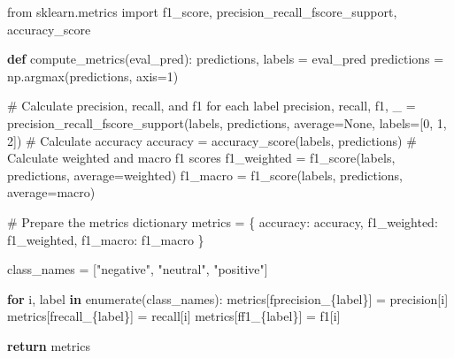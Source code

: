 \documentclass[
  letterpaper,
  DIV=11,
  numbers=noendperiod]{scrreprt}
\newenvironment{Shaded}{\begin{snugshade}}{\end{snugshade}}
\newcommand{\BuiltInTok}[1]{\textcolor[rgb]{0.00,0.23,0.31}{#1}}
\newcommand{\CommentTok}[1]{\textcolor[rgb]{0.37,0.37,0.37}{#1}}
\newcommand{\ControlFlowTok}[1]{\textcolor[rgb]{0.00,0.23,0.31}{\textbf{#1}}}
\newcommand{\DecValTok}[1]{\textcolor[rgb]{0.68,0.00,0.00}{#1}}
\newcommand{\ImportTok}[1]{\textcolor[rgb]{0.00,0.46,0.62}{#1}}
\newcommand{\KeywordTok}[1]{\textcolor[rgb]{0.00,0.23,0.31}{\textbf{#1}}}
\newcommand{\NormalTok}[1]{\textcolor[rgb]{0.00,0.23,0.31}{#1}}
\newcommand{\OperatorTok}[1]{\textcolor[rgb]{0.37,0.37,0.37}{#1}}
\newcommand{\SpecialCharTok}[1]{\textcolor[rgb]{0.37,0.37,0.37}{#1}}
\newcommand{\SpecialStringTok}[1]{\textcolor[rgb]{0.13,0.47,0.30}{#1}}
\newcommand{\StringTok}[1]{\textcolor[rgb]{0.13,0.47,0.30}{#1}}
\newcommand{\VariableTok}[1]{\textcolor[rgb]{0.07,0.07,0.07}{#1}}
\begin{document}
\begin{Shaded}
\begin{Highlighting}[]
\ImportTok{from}\NormalTok{ sklearn.metrics }\ImportTok{import}\NormalTok{ f1\_score, precision\_recall\_fscore\_support, accuracy\_score}

\KeywordTok{def}\NormalTok{ compute\_metrics(eval\_pred):}
\NormalTok{    predictions, labels }\OperatorTok{=}\NormalTok{ eval\_pred}
\NormalTok{    predictions }\OperatorTok{=}\NormalTok{ np.argmax(predictions, axis}\OperatorTok{=}\DecValTok{1}\NormalTok{)}

    \CommentTok{\# Calculate precision, recall, and f1 for each label}
\NormalTok{    precision, recall, f1, \_ }\OperatorTok{=}\NormalTok{ precision\_recall\_fscore\_support(labels, predictions, average}\OperatorTok{=}\VariableTok{None}\NormalTok{, labels}\OperatorTok{=}\NormalTok{[}\DecValTok{0}\NormalTok{, }\DecValTok{1}\NormalTok{, }\DecValTok{2}\NormalTok{])}
    \CommentTok{\# Calculate accuracy}
\NormalTok{    accuracy }\OperatorTok{=}\NormalTok{ accuracy\_score(labels, predictions)}
    \CommentTok{\# Calculate weighted and macro f1 scores}
\NormalTok{    f1\_weighted }\OperatorTok{=}\NormalTok{ f1\_score(labels, predictions, average}\OperatorTok{=}\StringTok{\textquotesingle{}weighted\textquotesingle{}}\NormalTok{)}
\NormalTok{    f1\_macro }\OperatorTok{=}\NormalTok{ f1\_score(labels, predictions, average}\OperatorTok{=}\StringTok{\textquotesingle{}macro\textquotesingle{}}\NormalTok{)}

    \CommentTok{\# Prepare the metrics dictionary}
\NormalTok{    metrics }\OperatorTok{=}\NormalTok{ \{}
        \StringTok{\textquotesingle{}accuracy\textquotesingle{}}\NormalTok{: accuracy,}
        \StringTok{\textquotesingle{}f1\_weighted\textquotesingle{}}\NormalTok{: f1\_weighted,}
        \StringTok{\textquotesingle{}f1\_macro\textquotesingle{}}\NormalTok{: f1\_macro}
\NormalTok{    \}}

\NormalTok{    class\_names }\OperatorTok{=}\NormalTok{ [}\StringTok{"negative"}\NormalTok{, }\StringTok{"neutral"}\NormalTok{, }\StringTok{"positive"}\NormalTok{]}
    
    \ControlFlowTok{for}\NormalTok{ i, label }\KeywordTok{in} \BuiltInTok{enumerate}\NormalTok{(class\_names):}
\NormalTok{        metrics[}\SpecialStringTok{f\textquotesingle{}precision\_}\SpecialCharTok{\{}\NormalTok{label}\SpecialCharTok{\}}\SpecialStringTok{\textquotesingle{}}\NormalTok{] }\OperatorTok{=}\NormalTok{ precision[i]}
\NormalTok{        metrics[}\SpecialStringTok{f\textquotesingle{}recall\_}\SpecialCharTok{\{}\NormalTok{label}\SpecialCharTok{\}}\SpecialStringTok{\textquotesingle{}}\NormalTok{] }\OperatorTok{=}\NormalTok{ recall[i]}
\NormalTok{        metrics[}\SpecialStringTok{f\textquotesingle{}f1\_}\SpecialCharTok{\{}\NormalTok{label}\SpecialCharTok{\}}\SpecialStringTok{\textquotesingle{}}\NormalTok{] }\OperatorTok{=}\NormalTok{ f1[i]}

    \ControlFlowTok{return}\NormalTok{ metrics}
\end{Highlighting}
\end{Shaded}
\end{document}
